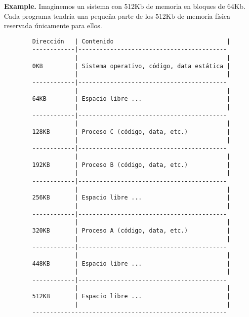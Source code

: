\documentclass[12pt]{article}
\theoremstyle{definition}
\begin{document}
\begin{shaded}

    \textbf{Example.} Imaginemos un sistema con 512Kb de memoria en bloques de
    64Kb. Cada programa tendría una pequeña parte de los 512Kb de memoria física
    reservada únicamente para ellos. 

    \footnotesize
    \begin{verbatim}
        Dirección   | Contenido                                |
        ------------|------------------------------------------
                    |                                          |
        0KB         | Sistema operativo, código, data estática | 
                    |                                          |
        ------------|------------------------------------------
                    |                                          |
        64KB        | Espacio libre ...                        | 
                    |                                          |
        ------------|------------------------------------------
                    |                                          |
        128KB       | Proceso C (código, data, etc.)           | 
                    |                                          |
        ------------|------------------------------------------
                    |                                          |
        192KB       | Proceso B (código, data, etc.)           | 
                    |                                          |
        ------------|------------------------------------------
                    |                                          |
        256KB       | Espacio libre ...                        | 
                    |                                          |
        ------------|------------------------------------------
                    |                                          |
        320KB       | Proceso A (código, data, etc.)           | 
                    |                                          |
        ------------|------------------------------------------
                    |                                          |
        448KB       | Espacio libre ...                        | 
                    |                                          |
        ------------|------------------------------------------
                    |                                          |
        512KB       | Espacio libre ...                        | 
                    |                                          |
        -------------------------------------------------------

    \end{verbatim}
\end{shaded}
\end{document}
